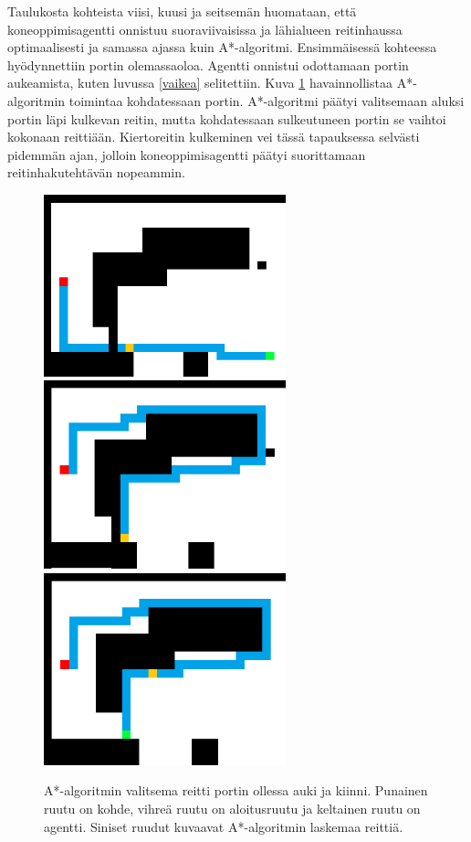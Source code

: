 \documentclass[utf8]{gradu3}
\begin{document}
Taulukosta kohteista viisi, kuusi ja seitsemän huomataan, että koneoppimisagentti onnistuu suoraviivaisissa ja lähialueen reitinhaussa optimaalisesti ja samassa ajassa kuin A*-algoritmi. Ensimmäisessä kohteessa hyödynnettiin portin olemassaoloa. Agentti onnistui odottamaan portin aukeamista, kuten luvussa \ref{vaikea} selitettiin. Kuva \ref{astargate} havainnollistaa A*-algoritmin toimintaa kohdatessaan portin. A*-algoritmi päätyi valitsemaan aluksi portin läpi kulkevan reitin, mutta kohdatessaan sulkeutuneen portin se vaihtoi kokonaan reittiään. Kiertoreitin kulkeminen vei tässä tapauksessa selvästi pidemmän ajan, jolloin koneoppimisagentti päätyi suorittamaan reitinhakutehtävän nopeammin.

\begin{figure}[h]
\includegraphics[width=7cm]{a_star_gate_collision.png}
\hspace{1 cm}
\vspace{1 cm}
\includegraphics[width=7cm]{a_star_detour.png}
\includegraphics[width=7cm]{a_star_detour_no_gate.png}
\caption{A*-algoritmin valitsema reitti portin ollessa auki ja kiinni. Punainen ruutu on kohde, vihreä ruutu on aloitusruutu ja keltainen ruutu on agentti. Siniset ruudut kuvaavat A*-algoritmin laskemaa reittiä.}
\label{astargate}
\end{figure}
\end{document}

